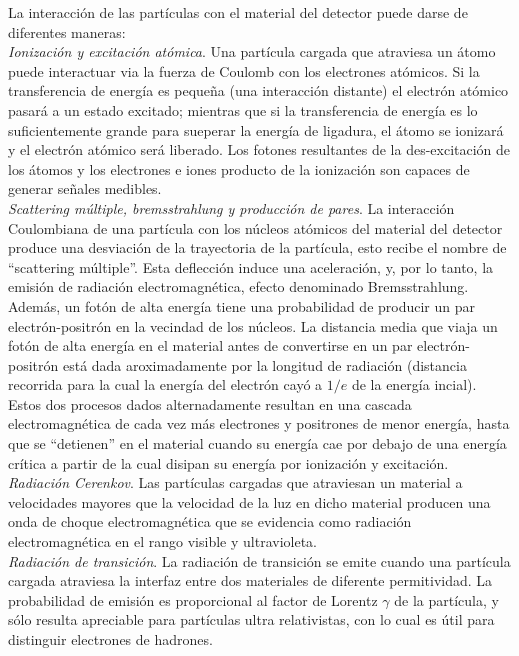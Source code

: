 La interacción de las partículas con el material del detector puede darse de diferentes maneras\cite{Instrumentation}:\\
\indent \emph{Ionización y excitación atómica}. Una partícula cargada que atraviesa un átomo puede interactuar via la fuerza de Coulomb con los electrones atómicos.
Si la transferencia de energía es pequeña (una interacción distante) el electrón atómico pasará a un estado excitado; mientras que si la transferencia de energía es lo suficientemente grande para sueperar la energía de ligadura, el átomo se ionizará y el electrón atómico será liberado. Los fotones resultantes de la des-excitación de los átomos y los electrones e iones producto de la ionización son capaces de generar señales medibles.\\ 
\indent \emph{Scattering múltiple, bremsstrahlung y producción de pares}. La interacción Coulombiana de una partícula con los núcleos atómicos del material del detector produce una desviación de la trayectoria de la partícula, esto recibe el nombre de ``scattering múltiple''. Esta deflección induce una aceleración, y, por lo tanto, la emisión de radiación electromagnética, efecto denominado Bremsstrahlung. Además, un fotón de alta energía tiene una probabilidad de producir un par electrón-positrón en la vecindad de los núcleos. La distancia media que viaja un fotón de alta energía en el material antes de convertirse en un par electrón-positrón está dada aroximadamente por la longitud de radiación (distancia recorrida para la cual la energía del electrón cayó a $1/e$ de la energía incial). Estos dos procesos dados alternadamente resultan en una cascada electromagnética de cada vez más electrones y positrones de menor energía, hasta que se ``detienen'' en el material cuando su energía cae por debajo de una energía crítica a partir de la cual disipan su energía por ionización y excitación.\\
\indent \emph{Radiación Cerenkov}. Las partículas cargadas que atraviesan un material a velocidades mayores que la velocidad de la luz en dicho material producen una onda de choque electromagnética que se evidencia como radiación electromagnética en el rango visible y ultravioleta.\\
\indent \emph{Radiación de transición}. La radiación de transición se emite cuando una partícula cargada atraviesa la interfaz entre dos materiales de diferente permitividad. La probabilidad de emisión es proporcional al factor de Lorentz $\gamma$ de la partícula, y sólo resulta apreciable para partículas ultra relativistas, con lo cual es útil para distinguir electrones de hadrones. 

